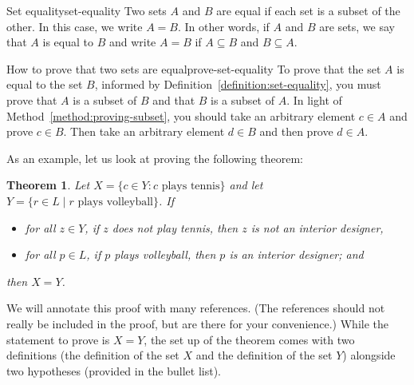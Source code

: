 \documentclass{book}
\newcounter{ekcounter}%
\theoremstyle{ekimcustom}
\newtheorem{theorem}[ekcounter]{Theorem}
\begin{document}
\begin{bdefinition}{Set equality}{set-equality}
Two sets $A$ and $B$ are equal if each set is a subset of the other. In this case, we write $A=B$. In other words, if $A$ and $B$ are sets, we say that $A$ is equal to $B$ and write $A=B$ if $A \subseteq B$ and $B \subseteq A$.
\end{bdefinition}
\begin{bmethod}{How to prove that two sets are equal}{prove-set-equality}
To prove that the set $A$ is equal to the set $B$, informed by Definition~\ref{definition:set-equality}, you must prove that $A$ is a subset of $B$ and that $B$ is a subset of $A$. In light of Method~\ref{method:proving-subset}, you should take an arbitrary element $c \in A$ and prove $c \in B$. Then take an arbitrary element $d \in B$ and then prove $d \in A$.
\end{bmethod}
As an example, let us look at proving the following theorem:
\begin{theorem}
Let $X = \{c \in Y : c \text{ plays tennis}\}$ and let $Y = \{r \in L \mid r \text{ plays volleyball}\}$. If
\begin{itemize}
\item for all $z \in Y$, if $z$ does not play tennis, then $z$ is not an interior designer,
\item for all $p \in L$, if $p$ plays volleyball, then $p$ is an interior designer; and
\end{itemize}
then $X = Y$.
\end{theorem}
We will annotate this proof with many references. (The references should not really be included in the proof, but are there for your convenience.) While the statement to prove is $X=Y$, the set up of the theorem comes with two definitions (the definition of the set $X$ and the definition of the set $Y$) alongside two hypotheses (provided in the bullet list).
\end{document}
